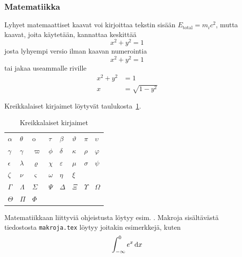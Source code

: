 \subsubsection{Matematiikka}
\label{sec:esimmatematiikka}

Lyhyet matemaattiset kaavat voi kirjoittaa tekstin
sisään $E_{\textrm{total}} = m_i c^2$, mutta kaavat, joita käytetään, 
kannattaa keskittää
%
\begin{equation}
\label{eq:kaava1}
x^2 + y^2 = 1 
\end{equation}
%
josta lyhyempi versio ilman kaavan numerointia
%
\[ x^2 + y^2 = 1 \]
%
tai jakaa useammalle riville
\begin{equation}
\label{eq:kaava2}
\begin{aligned}
x^2 + y^2 &= 1 \\
        x &= \sqrt{1-y^2}
\end{aligned}
\end{equation}
%

Kreikkalaiset kirjaimet löytyvät taulukosta~\ref{table:kreikka}.

\begin{table}
\caption{Kreikkalaiset kirjaimet}
\label{table:kreikka}
\begin{center}
\begin{tabular}{|llllllll|}
\hline
$\alpha$        &$\theta$       &o              &$\tau$         &%
$\beta$         &$\vartheta$    &$\pi$          &$\upsilon$     \\
$\gamma$        &$\gamma$       &$\varpi$       &$\phi$         &%
$\delta$        &$\kappa$       &$\rho$         &$\varphi$      \\
$\epsilon$      &$\lambda$      &$\varrho$      &$\chi$         &%
$\varepsilon$   &$\mu$          &$\sigma$       &$\psi$         \\
$\zeta$         &$\nu$          &$\varsigma$    &$\omega$       &%
$\eta$          &$\xi$          &               &               \\
\hline
$\Gamma$        &$\Lambda$      &$\Sigma$       &$\Psi$         &%
$\Delta$        &$\Xi$          &$\Upsilon$     &$\Omega$       \\
$\Theta$        &$\Pi$          &$\Phi$         & & & & &       \\
\hline
\end{tabular}
\end{center}
\end{table}

Matematiikkaan liittyviä ohjeistusta löytyy esim. \citet{RefWorks:doc:601937178f0884cb02a8458c}.
Makroja sisältävästä tiedostosta \verb!makroja.tex! löytyy joitakin
esimerkkejä, kuten 
%
\[ \int_{-\infty}^{0} e^{x} \, \textrm{d}{x} \]
%

